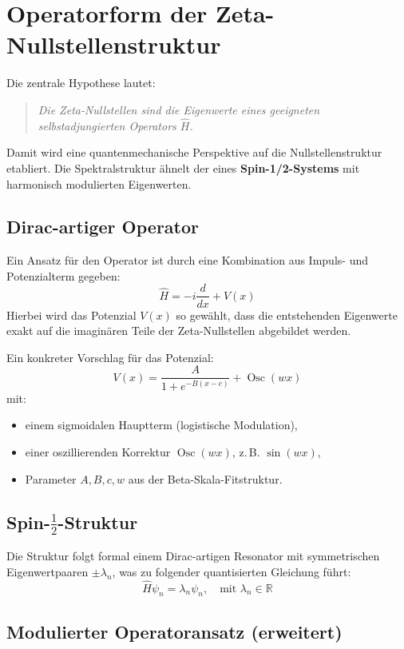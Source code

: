 \section{Operatorform der Zeta-Nullstellenstruktur}

Die zentrale Hypothese lautet:

\begin{quote}
\emph{Die Zeta-Nullstellen sind die Eigenwerte eines geeigneten selbstadjungierten Operators \( \widehat{H} \).}
\end{quote}

Damit wird eine quantenmechanische Perspektive auf die Nullstellenstruktur etabliert. Die Spektralstruktur ähnelt der eines \textbf{Spin-1/2-Systems} mit harmonisch modulierten Eigenwerten.

\subsection{Dirac-artiger Operator}

Ein Ansatz für den Operator ist durch eine Kombination aus Impuls- und Potenzialterm gegeben:
\[
\widehat{H} = -i \frac{d}{dx} + V(x)
\]
Hierbei wird das Potenzial \( V(x) \) so gewählt, dass die entstehenden Eigenwerte exakt auf die imaginären Teile der Zeta-Nullstellen abgebildet werden.

Ein konkreter Vorschlag für das Potenzial:
\[
V(x) = \frac{A}{1 + e^{-B(x - c)}} + \operatorname{Osc}(w x)
\]
mit:
\begin{itemize}[label=\textbullet]
    \item einem sigmoidalen Hauptterm (logistische Modulation),
    \item einer oszillierenden Korrektur \( \operatorname{Osc}(w x) \), z.\,B. \( \sin(w x) \),
    \item Parameter \( A, B, c, w \) aus der Beta-Skala-Fitstruktur.
\end{itemize}

\subsection{Spin-\( \frac{1}{2} \)-Struktur}

Die Struktur folgt formal einem Dirac-artigen Resonator mit symmetrischen Eigenwertpaaren \( \pm \lambda_n \), was zu folgender quantisierten Gleichung führt:
\[
\widehat{H} \psi_n = \lambda_n \psi_n, \quad \text{mit } \lambda_n \in \mathbb{R}
\]

\subsection{Modulierter Operatoransatz (erweitert)}

